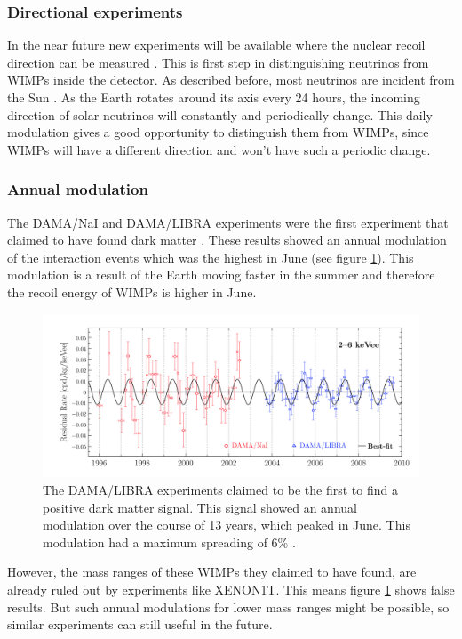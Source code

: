 \documentclass{article}
\begin{document}
\subsubsection{Directional experiments}
In the near future new experiments will be available where the nuclear recoil direction can be measured \cite{Ahlen:2009ev}. This is first step in distinguishing neutrinos from WIMPs inside the detector. As described before, most neutrinos are incident from the Sun \cite{Billard:2013qya}. As the Earth rotates around its axis every 24 hours, the incoming direction of solar neutrinos will constantly and periodically change. This daily modulation gives a good opportunity to distinguish them from WIMPs, since WIMPs will have a different direction and won't have such a periodic change. 

\subsubsection{Annual modulation}
The DAMA/NaI and DAMA/LIBRA experiments were the first experiment that claimed to have found dark matter \cite{Freese:2012xd}. These results showed an annual modulation of the interaction events which was the highest in June (see figure \ref{Ann Mod}). This modulation is a result of the Earth moving faster in the summer and therefore the recoil energy of WIMPs is higher in June. 
\begin{figure}[h]
    \centering
    \includegraphics[width=\textwidth]{Annualmodulation.png}
    \caption{The DAMA/LIBRA experiments claimed to be the first to find a positive dark matter signal. This signal showed an annual modulation over the course of 13 years, which peaked in June. This modulation had a maximum spreading of 6\% \cite{Freese:2012xd}.}
    \label{Ann Mod}
\end{figure}

However, the mass ranges of these WIMPs they claimed to have found, are already ruled out by experiments like XENON1T. This means figure \ref{Ann Mod} shows false results. But such annual modulations for lower mass ranges might be possible, so similar experiments can still useful in the future. 
\end{document}
